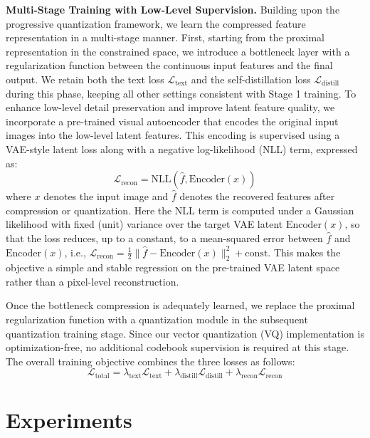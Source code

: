 \documentclass{llmxive}
\providecommand{\paragrapha}[1]{\par\addvspace{0.45em}\noindent\textbf{#1}}
\begin{document}
\paragrapha{Multi-Stage Training with Low-Level Supervision. }Building upon the progressive quantization framework, we learn the compressed feature representation in a multi-stage manner. First, starting from the proximal representation in the constrained space, we introduce a bottleneck layer with a regularization function between the continuous input features and the final output. We retain both the text loss \(\mathcal{L}_{\text{text}}\) and the self-distillation loss \(\mathcal{L}_{\text{distill}}\) during this phase, keeping all other settings consistent with Stage 1 training. To enhance low-level detail preservation and improve latent feature quality, we incorporate a pre-trained visual autoencoder that encodes the original input images into the low-level latent features. This encoding is supervised using a VAE-style latent loss along with a negative log-likelihood (NLL) term, expressed as:
\begin{equation}
\mathcal{L}_{\text{recon}} = \text{NLL}(\hat{f}, \text{Encoder}(x))
\end{equation}
where \(x\) denotes the input image and $\hat{f}$ denotes the recovered features after compression or quantization. Here the NLL term is computed under a Gaussian likelihood with fixed (unit) variance over the target VAE latent $\text{Encoder}(x)$, so that the loss reduces, up to a constant, to a mean-squared error between $\hat{f}$ and $\text{Encoder}(x)$, i.e., $\mathcal{L}_{\text{recon}} = \tfrac{1}{2}\lVert \hat{f} - \text{Encoder}(x)\rVert_2^2 + \text{const}$. This makes the objective a simple and stable regression on the pre-trained VAE latent space rather than a pixel-level reconstruction.

Once the bottleneck compression is adequately learned, we replace the proximal regularization function with a quantization module in the subsequent quantization training stage. Since our vector quantization (VQ) implementation is optimization-free, no additional codebook supervision is required at this stage. The overall training objective combines the three losses as follows:
\begin{equation}
\mathcal{L}_{\text{total}} = \lambda_{\text{text}}\mathcal{L}_{\text{text}} + \lambda_{\text{distill}}\mathcal{L}_{\text{distill}} + \lambda_{\text{recon}}\mathcal{L}_{\text{recon}}
\end{equation}

\section{Experiments}
\label{sec:experiments}
\end{document}
